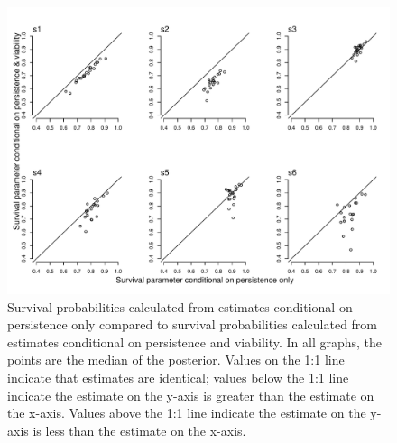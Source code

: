 \documentclass[12pt, oneside]{article}   	%
\begin{document}
 \begin{figure}[!h]
        \centering
        \includegraphics[page=1,width=\textwidth]{../../figures/compare-structured-survival.pdf} 
            \caption{ Survival probabilities calculated from estimates conditional on persistence only compared to survival probabilities calculated from estimates conditional on persistence and viability. In all graphs, the points are the median of the posterior. Values on the 1:1 line indicate that estimates are identical; values below the 1:1 line indicate the estimate on the y-axis is greater than the estimate on the x-axis. Values above the 1:1 line indicate the estimate on the y-axis is less than the estimate on the x-axis. }
 \label{fig:germination-estimates-population}
\end{figure}
\end{document}
